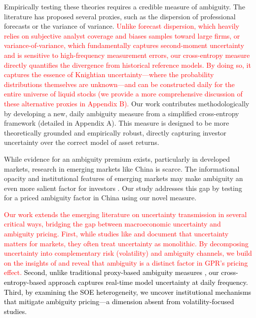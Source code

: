 \documentclass[preprint,12pt,authoryear]{elsarticle}
\begin{document}
Empirically testing these theories requires a credible measure of ambiguity. The literature has proposed several proxies, such as the dispersion of professional forecasts \citep{Brenner2018, Ulrich2013} or the variance of variance. \textcolor{red}{Unlike forecast dispersion, which heavily relies on subjective analyst coverage and biases samples toward large firms, or variance-of-variance, which fundamentally captures second-moment uncertainty and is sensitive to high-frequency measurement errors, our cross-entropy measure directly quantifies the divergence from historical reference models. By doing so, it captures the essence of Knightian uncertainty---where the probability distributions themselves are unknown---and can be constructed daily for the entire universe of liquid stocks (we provide a more comprehensive discussion of these alternative proxies in Appendix B).} Our work contributes methodologically by developing a new, daily ambiguity measure from a simplified cross-entropy framework (detailed in Appendix A). This measure is designed to be more theoretically grounded and empirically robust, directly capturing investor uncertainty over the correct model of asset returns.

While evidence for an ambiguity premium exists, particularly in developed markets, research in emerging markets like China is scarce. The informational opacity and institutional features of emerging markets may make ambiguity an even more salient factor for investors \citep{Easley2009}. Our study addresses this gap by testing for a priced ambiguity factor in China using our novel measure.

\textcolor{red}{Our work extends the emerging literature on uncertainty transmission in several critical ways, bridging the gap between macroeconomic uncertainty and ambiguity pricing. First, while studies like \citet{Baker2016} and \citet{Caldara2022} document that uncertainty matters for markets, they often treat uncertainty as monolithic. By decomposing uncertainty into complementary risk (volatility) and ambiguity channels, we build on the insights of \citet{Brenner2018} and reveal that ambiguity is a distinct factor in GPR's pricing effect.} \textcolor{black}{Second, unlike traditional proxy-based ambiguity measures \citep{Brenner2018}, our cross-entropy-based approach captures real-time model uncertainty at daily frequency. Third, by examining the SOE heterogeneity, we uncover institutional mechanisms that mitigate ambiguity pricing---a dimension absent from volatility-focused studies.}
\end{document}
